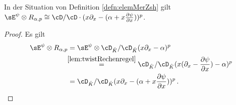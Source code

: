 \begin{lem} In der Situation von Definition \ref{defn:elemMerZsh} gilt
$\sE^{\psi}\otimes R_{\alpha,p}\cong
\cD/\cD\cdot(x\partial_x-(\alpha+x\frac{\partial \psi}{\partial x}))^p$.
\end{lem}
\begin{proof}
Es gilt
\begin{align*}
\sE^{\psi}\otimes R_{\alpha,p}
  &=\sE^{\psi}\otimes\cD_{\hat K}/\cD_{\hat K}(x\partial_x-\alpha)^p
\\&\!\!\overset{\ref{lem:twistRechenregel}}{=} \cD_{\hat K}/\cD_{\hat K}
  (x(\partial_x-\frac{\partial \psi}{\partial x})-\alpha)^p
\\&=\cD_{\hat K}/\cD_{\hat K}
  (x\partial_x-(\alpha+x\frac{\partial \psi}{\partial x}))^p \,.
\end{align*}
\end{proof}

